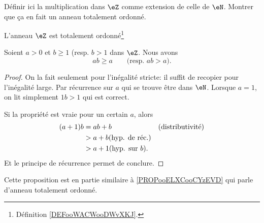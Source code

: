 \begin{probleme}	\label{TODOooDefinirMultiplicationRelatifs}
	Définir ici la multiplication dans \( \eZ \) comme extension de celle de \( \eN \). Montrer que ça en fait un anneau totalement ordonné.
\end{probleme}

\begin{proposition}	\label{PROPooADGIooTioqdu}
	L'anneau \( \eZ\) est totalement ordonné\footnote{Définition \ref{DEFooWACWooDWvXKJ}.}
\end{proposition}

\begin{lemma}       \label{LEMooSVDDooWsyxNP}
	Soient \( a>0\) et \( b \geq 1\) (resp. \( b > 1 \) dans \( \eZ\). Nous avons
	\begin{equation}
		ab \geq a \qquad \text{(resp. }ab>a\text{)}.
	\end{equation}
\end{lemma}

\begin{proof}
	On la fait seulement pour l'inégalité stricte: il suffit de recopier pour l'inégalité large. Par récurrence sur \( a \) qui se trouve être dans \( \eN \). Lorsque \( a = 1 \), on lit simplement \( 1b > 1 \) qui est correct.

	Si la propriété est vraie pour un certain \( a \), alors
	\begin{align}
		(a+1) b & = ab + b                          &  & \text{(distributivité)} \\
		        & > a + b\text{(hyp. de réc.)}                                   \\
		        & > a + 1\text{(hyp. sur \( b \)).}
	\end{align}
	Et le principe de récurrence permet de conclure.
\end{proof}

\begin{normaltext}	\label{NORMooLienRelatifsAnnTotOrdonne}
	Cette proposition est en partie similaire à \ref{PROPooELXCooCYzEVD} qui parle d'anneau totalement ordonné.
\end{normaltext}

